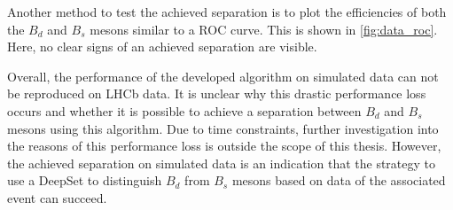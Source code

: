 Another method to test the achieved separation is to plot the efficiencies of both the $B_d$ and $B_s$ mesons similar to a ROC curve.
This is shown in \autoref{fig:data_roc}.
Here, no clear signs of an achieved separation are visible.

Overall, the performance of the developed algorithm on simulated data can not be reproduced on LHCb data.
It is unclear why this drastic performance loss occurs and whether it is possible to achieve a separation between $B_d$ and $B_s$ mesons using this algorithm.
Due to time constraints, further investigation into the reasons of this performance loss is outside the scope of this thesis.
However, the achieved separation on simulated data is an indication that the strategy to use a DeepSet to distinguish $B_d$ from $B_s$ mesons based on data of the associated event can succeed.

